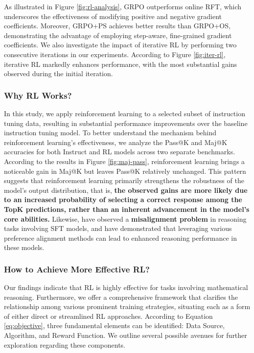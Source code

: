 \begin{itemize}[topsep=0pt]
\begin{itemize}[topsep=0pt]
As illustrated in Figure \ref{fig:rl-analysis}, GRPO outperforms online RFT, which underscores the effectiveness of modifying positive and negative gradient coefficients. Moreover, GRPO+PS achieves better results than GRPO+OS, demonstrating the advantage of employing step-aware, fine-grained gradient coefficients. We also investigate the impact of iterative RL by performing two consecutive iterations in our experiments. According to Figure \ref{fig:iter-rl}, iterative RL markedly enhances performance, with the most substantial gains observed during the initial iteration.

\subsubsection{Why RL Works?} In this study, we apply reinforcement learning to a selected subset of instruction tuning data, resulting in substantial performance improvements over the baseline instruction tuning model. To better understand the mechanism behind reinforcement learning's effectiveness, we analyze the Pass@K and Maj@K accuracies for both Instruct and RL models across two separate benchmarks. According to the results in Figure \ref{fig:maj-pass}, reinforcement learning brings a noticeable gain in Maj@K but leaves Pass@K relatively unchanged. This pattern suggests that reinforcement learning primarily strengthens the robustness of the model’s output distribution, that is, \textbf{the observed gains are more likely due to an increased probability of selecting a correct response among the TopK predictions, rather than an inherent advancement in the model’s core abilities.} Likewise, \citep{wang2023making} have observed a \textbf{misalignment problem} in reasoning tasks involving SFT models, and have demonstrated that leveraging various preference alignment methods \citep{yuan2023rrhf,song2023preference,wang2023making} can lead to enhanced reasoning performance in these models.

\subsubsection{How to Achieve More Effective RL?}
\label{sec:effec_rl}
Our findings indicate that RL is highly effective for tasks involving mathematical reasoning. Furthermore, we offer a comprehensive framework that clarifies the relationship among various prominent training strategies, situating each as a form of either direct or streamlined RL approaches. According to Equation \ref{eq:objective}, three fundamental elements can be identified: Data Source, Algorithm, and Reward Function. We outline several possible avenues for further exploration regarding these components.


\end{itemize}
\end{itemize}
